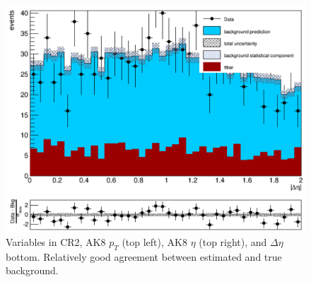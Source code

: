 \begin{figure}[thb!]
\begin{center}
\includegraphics[scale=0.35]{Figures/dEtaCR2.pdf}
\end{center}
\caption{Variables in CR2, AK8 $p_{T}$ (top left), AK8 $\eta$ (top right), and $\Delta\eta$ bottom. Relatively good agreement between estimated and true background.}
\label{fig:CR2start}
\end{figure}


